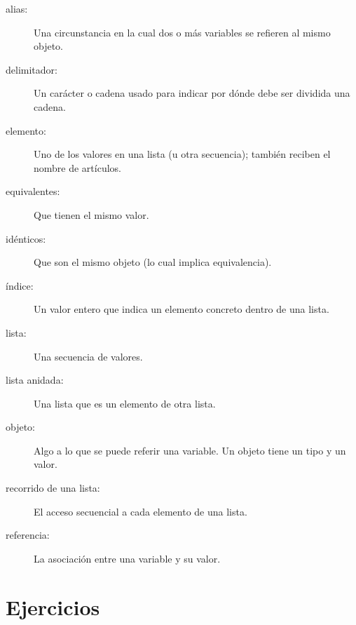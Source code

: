 \begin{description}

\item[alias:] Una circunstancia en la cual dos o más variables se refieren al mismo
objeto.

\item[delimitador:] Un carácter o cadena usado para indicar por dónde
debe ser dividida una cadena.

\item[elemento:] Uno de los valores en una lista (u otra secuencia);
también reciben el nombre de artículos.

\item[equivalentes:] Que tienen el mismo valor.

\item[idénticos:] Que son el mismo objeto (lo cual implica equivalencia).

\item[índice:] Un valor entero que indica un elemento concreto dentro de una lista.

\item[lista:] Una secuencia de valores.

\item[lista anidada:] Una lista que es un elemento de otra lista.

\item[objeto:] Algo a lo que se puede referir una variable. Un objeto
tiene un tipo y un valor.

\item[recorrido de una lista:] El acceso secuencial a cada elemento de una lista.

\item[referencia:] La asociación entre una variable y su valor.

\end{description}


\section{Ejercicios}

